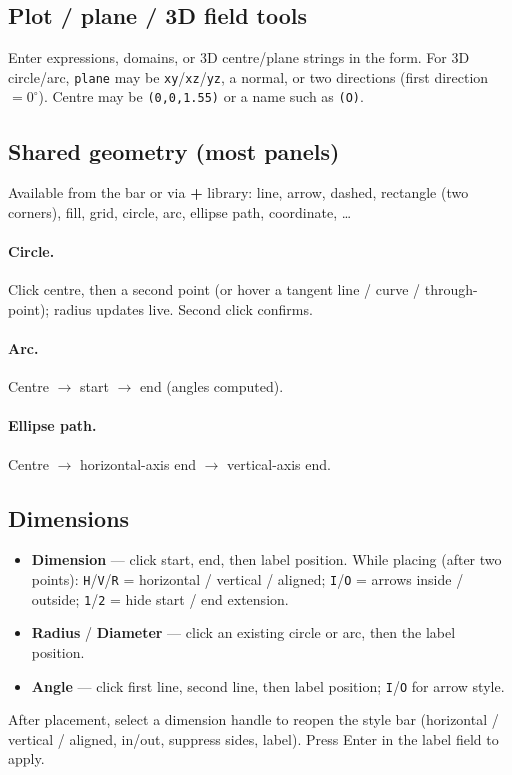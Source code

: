\documentclass[a4paper]{ltxdoc}
\newcommand{\ui}[1]{\textbf{#1}}
\newcommand{\key}[1]{\texttt{#1}}
\begin{document}
\subsection{Plot / plane / 3D field tools}
Enter expressions, domains, or 3D centre/plane strings in the form.
For 3D circle/arc, \texttt{plane} may be \texttt{xy}/\texttt{xz}/\texttt{yz},
a normal, or two directions (first direction $=0^\circ$).  Centre may be
\texttt{(0,0,1.55)} or a name such as \texttt{(O)}.

\subsection{Shared geometry (most panels)}
Available from the bar or via \ui{+} library: line, arrow, dashed,
rectangle (two corners), fill, grid, circle, arc, ellipse path,
coordinate, \ldots

\paragraph{Circle.}
Click centre, then a second point (or hover a tangent line / curve /
through-point); radius updates live.  Second click confirms.

\paragraph{Arc.}
Centre $\rightarrow$ start $\rightarrow$ end (angles computed).

\paragraph{Ellipse path.}
Centre $\rightarrow$ horizontal-axis end $\rightarrow$ vertical-axis end.

\subsection{Dimensions}
\begin{itemize}[nosep]
  \item \ui{Dimension} --- click start, end, then label position.
        While placing (after two points):
        \key{H}/\key{V}/\key{R} = horizontal / vertical / aligned;
        \key{I}/\key{O} = arrows inside / outside;
        \key{1}/\key{2} = hide start / end extension.
  \item \ui{Radius} / \ui{Diameter} --- click an existing circle or arc,
        then the label position.
  \item \ui{Angle} --- click first line, second line, then label
        position; \key{I}/\key{O} for arrow style.
\end{itemize}
After placement, select a dimension handle to reopen the style bar
(horizontal / vertical / aligned, in/out, suppress sides, label).
Press Enter in the label field to apply.
\end{document}
